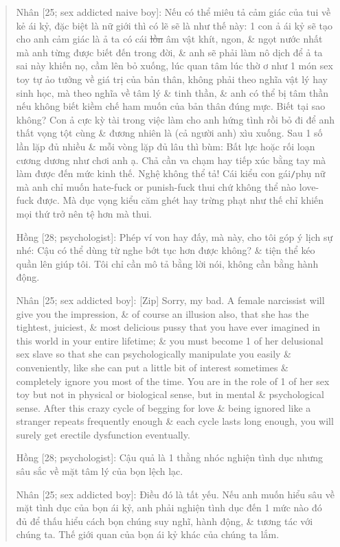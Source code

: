 \documentclass[12pt]{article}
\begin{document}
\begin{quote}
	{\sf Nhân [25; sex addicted naive boy]:} Nếu có thể miêu tả cảm giác của tui về kẻ ái kỷ, đặc biệt là nữ giới thì có lẽ sẽ là như thế này: 1 con ả ái kỷ sẽ tạo cho anh cảm giác là ả ta có cái \st{lồn} âm vật khít, ngon, \& ngọt nước nhất mà anh từng được biết đến trong đời, \& anh sẽ phải làm nô dịch để ả ta sai này khiến nọ, cầm lên bỏ xuống, lúc quan tâm lúc thờ ơ như 1 món sex toy tự ảo tưởng về giá trị của bản thân, không phải theo nghĩa vật lý hay sinh học, mà theo nghĩa về tâm lý \& tinh thần, \& anh có thể bị tâm thần nếu không biết kiềm chế ham muốn của bản thân đúng mực. Biết tại sao không? Con ả cực kỳ tài trong việc làm cho anh hứng tình rồi bỏ đi để anh thất vọng tột cùng \& đương nhiên là (cả người anh) xìu xuống. Sau 1 số lần lặp đủ nhiều \& mỗi vòng lặp đủ lâu thì bùm: Bất lực hoặc rối loạn cương dương như chơi anh ạ. Chả cần va chạm hay tiếp xúc bằng tay mà làm được đến mức kinh thế. Nghệ không thể tả! Cái kiểu con gái{\tt/}phụ nữ mà anh chỉ muốn hate-fuck or punish-fuck thui chứ không thể nào love-fuck được. Mà dục vọng kiểu căm ghét hay trừng phạt như thế chỉ khiến mọi thứ trở nên tệ hơn mà thui.
	
	{\sf Hồng [28; psychologist]:} Phép ví von hay đấy, mà này, cho tôi góp ý lịch sự nhé: Cậu có thể dùng từ nghe bớt tục hơn được không? \& tiện thể kéo quần lên giúp tôi. Tôi chỉ cần mô tả bằng lời nói, không cần bằng hành động.
	
	{\sf Nhân [25; sex addicted boy]:} [Zip] Sorry, my bad. A female narcissist will give you the impression, \& of course an illusion also, that she has the tightest, juiciest, \& most delicious pussy that you have ever imagined in this world in your entire lifetime; \& you must become 1 of her delusional sex slave so that she can psychologically manipulate you easily \& conveniently, like she can put a little bit of interest sometimes \& completely ignore you most of the time. You are in the role of 1 of her sex toy but not in physical or biological sense, but in mental \& psychological sense. After this crazy cycle of begging for love \& being ignored like a stranger repeats frequently enough \& each cycle lasts long enough, you will surely get erectile dysfunction eventually.
	
	{\sf Hồng [28; psychologist]:} Cậu quả là 1 thằng nhóc nghiện tình dục nhưng sâu sắc về mặt tâm lý của bọn lệch lạc.
	
	{\sf Nhân [25; sex addicted boy]:} Điều đó là tất yếu. Nếu anh muốn hiểu sâu về mặt tình dục của bọn ái kỷ, anh phải nghiện tình dục đến 1 mức nào đó đủ để thấu hiểu cách bọn chúng suy nghĩ, hành động, \& tương tác với chúng ta. Thế giới quan của bọn ái kỷ khác của chúng ta lắm.
\end{quote}
\end{document}
